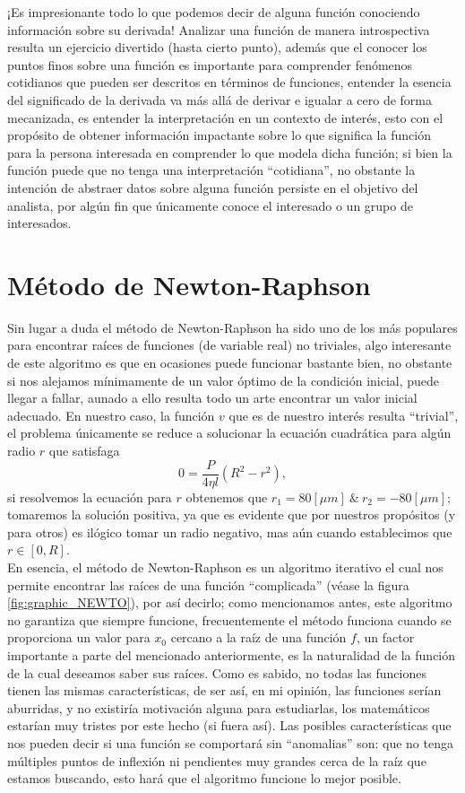 ¡Es impresionante todo lo que podemos decir de alguna función conociendo información sobre su derivada! Analizar una función de manera introspectiva resulta un ejercicio divertido (hasta cierto punto), además que el conocer los puntos finos sobre una función es importante para comprender fenómenos cotidianos que pueden ser descritos en términos de funciones, entender la esencia del significado de la derivada va más allá de derivar e igualar a cero de forma mecanizada, es entender la interpretación en un contexto de interés, esto con el propósito de obtener información impactante sobre lo que significa la función para la persona interesada en comprender lo que modela dicha función; si bien la función puede que no tenga una interpretación ``cotidiana'', no obstante la intención de abstraer datos sobre alguna función persiste en el objetivo del analista, por algún fin que únicamente conoce el interesado o un grupo de interesados. 
\\
\clearpage
\section{Método de Newton-Raphson}
Sin lugar a duda el método de Newton-Raphson ha sido uno de los más populares para encontrar raíces de funciones (de variable real) no triviales, algo interesante de este algoritmo es que en ocasiones puede funcionar bastante bien, no obstante si nos alejamos mínimamente de un valor óptimo de la condición inicial, puede llegar a fallar, aunado a ello resulta todo un arte encontrar un valor inicial adecuado. En nuestro caso, la función $v$ que es de nuestro interés resulta ``trivial'', el problema únicamente se reduce a solucionar la ecuación cuadrática para algún radio $r$ que satisfaga $$  0=\frac{P}{4\eta l}(R^{2}-r^{2}), $$ si resolvemos la ecuación para $r$ obtenemos que $r_{1}=80[\mu m] \ \& \ r_{2}=-80[\mu m]; $ tomaremos la solución positiva, ya que es evidente que por nuestros propósitos (y para otros) es ilógico tomar un radio negativo, mas aún cuando establecimos que $r \in [0,R]$.\\

En esencia, el método de Newton-Raphson es un algoritmo iterativo el cual nos permite encontrar las raíces de una función ``complicada'' (véase la figura \ref{fig:graphic_NEWTO}), por así decirlo; como mencionamos antes, este algoritmo no garantiza que siempre funcione, frecuentemente el método funciona cuando se proporciona un valor para $x_{0}$ cercano a la raíz de una función $f$, un factor importante a parte del mencionado anteriormente, es la naturalidad de la función de la cual deseamos saber sus raíces. Como es sabido, no todas las funciones tienen las mismas características, de ser así, en mi opinión, las funciones serían aburridas, y no existiría motivación alguna para estudiarlas, los matemáticos estarían muy tristes por este hecho (si fuera así). Las posibles características que nos pueden decir si una función se comportará sin ``anomalias'' son: que no tenga múltiples puntos de inflexión ni pendientes muy grandes cerca de la raíz que estamos buscando, esto hará que el algoritmo funcione lo mejor posible.
